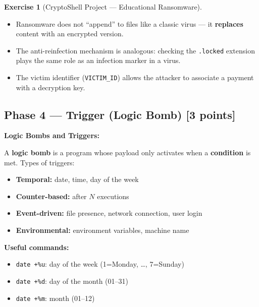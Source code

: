 \documentclass[a4paper,11pt]{article}
\theoremstyle{plain}
\theoremstyle{definition}
\newtheorem{exercice}{Exercise}
\begin{document}
\begin{exercice}[CryptoShell Project --- Educational Ransomware]
\begin{correction}
\begin{pointcle}
\begin{itemize}
    \item Ransomware does not ``append'' to files like a classic virus --- it \textbf{replaces} content with an encrypted version.
    \item The anti-reinfection mechanism is analogous: checking the \texttt{.locked} extension plays the same role as an infection marker in a virus.
    \item The victim identifier (\texttt{VICTIM\_ID}) allows the attacker to associate a payment with a decryption key.
\end{itemize}
\end{pointcle}

\end{correction}



\subsection*{Phase 4 --- Trigger (Logic Bomb) \hfill \normalsize [3 points]}

\begin{rappel}
\textbf{Logic Bombs and Triggers:}

A \textbf{logic bomb} is a program whose payload only activates when a \textbf{condition} is met. Types of triggers:
\begin{itemize}
    \item \textbf{Temporal:} date, time, day of the week
    \item \textbf{Counter-based:} after $N$ executions
    \item \textbf{Event-driven:} file presence, network connection, user login
    \item \textbf{Environmental:} environment variables, machine name
\end{itemize}

\medskip
\textbf{Useful commands:}
\begin{itemize}
    \item \texttt{date +\%u}: day of the week (1=Monday, \ldots, 7=Sunday)
    \item \texttt{date +\%d}: day of the month (01--31)
    \item \texttt{date +\%m}: month (01--12)
\end{itemize}


\end{rappel}
\end{exercice}
\end{document}
